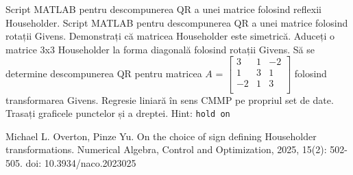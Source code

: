 \documentclass{exam}
\begin{document}
\begin{questions}
	\boxedpoints
	\pointsinmargin

	\question Script MATLAB pentru descompunerea QR a unei matrice folosind reflexii Householder.
	\question Script MATLAB pentru descompunerea QR a unei matrice folosind rotații Givens.
	\question Demonstrați că matricea Householder este simetrică.
	\question Aduceți o matrice 3x3 Householder la forma diagonală folosind
	rotații Givens.
	\question Să se determine descompunerea QR pentru matricea
	$A$ = $\begin{bmatrix}
			3  & 1 & -2 \\
			1  & 3 & 1  \\
			-2 & 1 & 3  \\
		\end{bmatrix}$ folosind transformarea Givens.
	\question Regresie liniară în sens CMMP pe propriul set de date. Trasați
	graficele punctelor și a dreptei. Hint: \verb|hold on|
\end{questions}

\begin{thebibliography}{1}

	Michael L. Overton, Pinze Yu. On the choice of sign defining Householder transformations. Numerical Algebra, Control and Optimization, 2025, 15(2): 502-505. doi: 10.3934/naco.2023025

\end{thebibliography}
\end{document}
